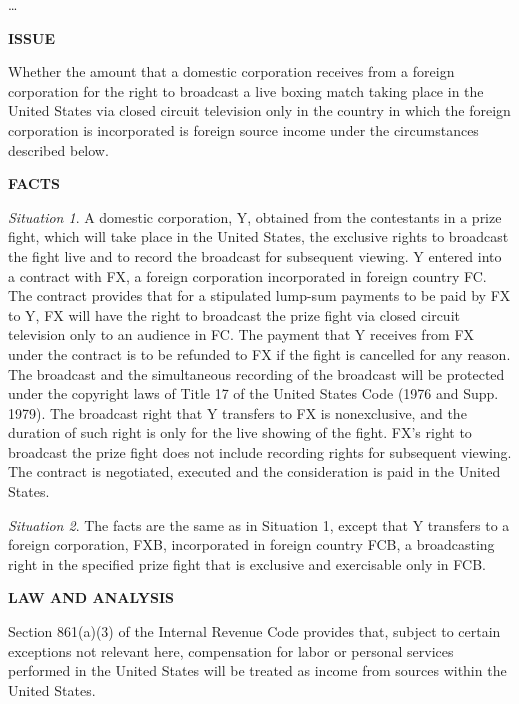 \begin{select}
\ldots
\begin{center}\textbf{ISSUE}
\end{center}
Whether the amount that a domestic corporation receives from a foreign corporation for the right to broadcast a live
boxing match taking place in the United States via closed circuit television only in the country in which the foreign
corporation is incorporated is foreign source income under the circumstances described below.

\begin{center}\textbf{FACTS}
\end{center}

\textit{Situation 1}. A domestic corporation, Y, obtained from the contestants in a prize fight, which will take place in the United States, the exclusive rights to broadcast the fight live and to record the broadcast for subsequent viewing. Y
entered into a contract with FX, a foreign corporation incorporated in foreign country FC. The contract provides that for a stipulated lump-sum payments to be paid by FX to Y, FX will have the right to broadcast the prize fight via closed
circuit television only to an audience in FC. The payment that Y receives from FX under the contract is to be refunded
to FX if the fight is cancelled for any reason. The broadcast and the simultaneous recording of the broadcast will be
protected under the copyright laws of Title 17 of the United States Code (1976 and Supp. 1979). The broadcast right that
Y transfers to FX is nonexclusive, and the duration of such right is only for the live showing of the fight. FX's right to
broadcast the prize fight does not include recording rights for subsequent viewing. The contract is negotiated, executed
and the consideration is paid in the United States.

\textit{Situation 2}. The facts are the same as in Situation 1, except that Y transfers to a foreign corporation, FXB, incorporated
in foreign country FCB, a broadcasting right in the specified prize fight that is exclusive and exercisable only in FCB.

\begin{center}\textbf{LAW AND ANALYSIS}
\end{center}

Section 861(a)(3) of the Internal Revenue Code provides that, subject to certain exceptions not relevant here,
compensation for labor or personal services performed in the United States will be treated as income from sources
within the United States.


\end{select}
